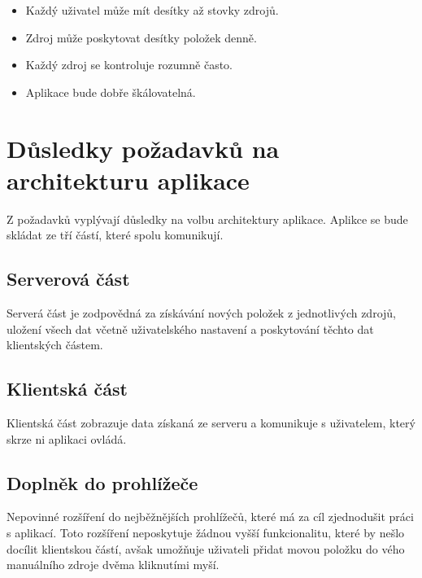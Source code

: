 \begin{itemize}
    \item Každý uživatel může mít desítky až stovky zdrojů.
	\item Zdroj může poskytovat desítky položek denně.
    \item Každý zdroj se kontroluje rozumně často.
    \item Aplikace bude dobře škálovatelná.
\end{itemize}

\section{Důsledky požadavků na architekturu aplikace}

Z požadavků vyplývají důsledky na volbu architektury aplikace.
Aplikce se bude skládat ze tří částí, které spolu komunikují.

\subsection{Serverová část}

Serverá část je zodpovědná za získávání nových položek z jednotlivých zdrojů, uložení všech dat včetně uživatelského nastavení a poskytování těchto dat klientských částem.

\subsection{Klientská část}

Klientská část zobrazuje data získaná ze serveru a komunikuje s uživatelem, který skrze ni aplikaci ovládá.

\subsection{Doplněk do prohlížeče}

Nepovinné rozšíření do nejběžnějších prohlížečů, které má za cíl zjednodušit práci s aplikací.
Toto rozšíření neposkytuje žádnou vyšší funkcionalitu, které by nešlo docílit klientskou částí, avšak umožňuje uživateli přidat movou položku do vého manuálního zdroje dvěma kliknutími myší.

